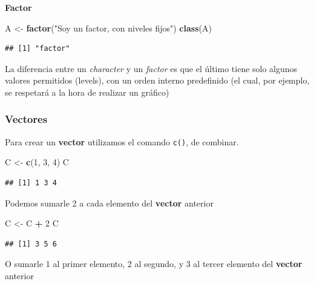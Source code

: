 \documentclass[]{book}
\newenvironment{Shaded}{\begin{snugshade}}{\end{snugshade}}
\newcommand{\DecValTok}[1]{\textcolor[rgb]{0.00,0.00,0.81}{#1}}
\newcommand{\KeywordTok}[1]{\textcolor[rgb]{0.13,0.29,0.53}{\textbf{#1}}}
\newcommand{\NormalTok}[1]{#1}
\newcommand{\OperatorTok}[1]{\textcolor[rgb]{0.81,0.36,0.00}{\textbf{#1}}}
\newcommand{\StringTok}[1]{\textcolor[rgb]{0.31,0.60,0.02}{#1}}
\begin{document}
\textbf{Factor}

\begin{Shaded}
\begin{Highlighting}[]
\NormalTok{A <-}\StringTok{ }\KeywordTok{factor}\NormalTok{(}\StringTok{"Soy un factor, con niveles fijos"}\NormalTok{)}
\KeywordTok{class}\NormalTok{(A)}
\end{Highlighting}
\end{Shaded}

\begin{verbatim}
## [1] "factor"
\end{verbatim}

La diferencia entre un \emph{character} y un \emph{factor} es que el último tiene solo algunos valores permitidos (levels), con un orden interno predefinido (el cual, por ejemplo, se respetará a la hora de realizar un gráfico)

\hypertarget{vectores}{%
\subsubsection{Vectores}\label{vectores}}

Para crear un \textbf{vector} utilizamos el comando \texttt{c()}, de combinar.

\begin{Shaded}
\begin{Highlighting}[]
\NormalTok{C <-}\StringTok{ }\KeywordTok{c}\NormalTok{(}\DecValTok{1}\NormalTok{, }\DecValTok{3}\NormalTok{, }\DecValTok{4}\NormalTok{)}
\NormalTok{C}
\end{Highlighting}
\end{Shaded}

\begin{verbatim}
## [1] 1 3 4
\end{verbatim}

Podemos sumarle 2 a cada elemento del \textbf{vector} anterior

\begin{Shaded}
\begin{Highlighting}[]
\NormalTok{C <-}\StringTok{ }\NormalTok{C }\OperatorTok{+}\StringTok{ }\DecValTok{2}
\NormalTok{C}
\end{Highlighting}
\end{Shaded}

\begin{verbatim}
## [1] 3 5 6
\end{verbatim}

O sumarle 1 al primer elemento, 2 al segundo, y 3 al tercer elemento del \textbf{vector} anterior
\end{document}
